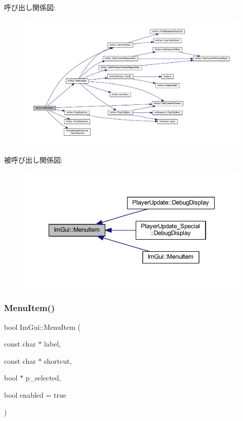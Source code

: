 呼び出し関係図\+:\nopagebreak
\begin{figure}[H]
\begin{center}
\leavevmode
\includegraphics[width=350pt]{namespace_im_gui_aa1bae511ca47478998693a9d8c84f2e6_cgraph}
\end{center}
\end{figure}
被呼び出し関係図\+:\nopagebreak
\begin{figure}[H]
\begin{center}
\leavevmode
\includegraphics[width=348pt]{namespace_im_gui_aa1bae511ca47478998693a9d8c84f2e6_icgraph}
\end{center}
\end{figure}
\mbox{\label{namespace_im_gui_a237e76bff3088f1c2622f4aebae2356e}} 
\subsubsection{\texorpdfstring{Menu\+Item()}{MenuItem()}\hspace{0.1cm}{\footnotesize\ttfamily [2/2]}}
{\footnotesize\ttfamily bool Im\+Gui\+::\+Menu\+Item (\begin{DoxyParamCaption}\item[{const char $\ast$}]{label,  }\item[{const char $\ast$}]{shortcut,  }\item[{bool $\ast$}]{p\+\_\+selected,  }\item[{bool}]{enabled = {\ttfamily true} }\end{DoxyParamCaption})}



